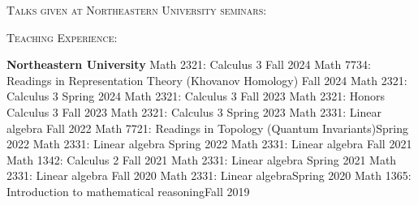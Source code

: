 \documentclass[12pt]{amsart}
\renewcommand{\i}{\indent}
\renewcommand{\j}{\indent}
\newcommand{\w}{\vskip5pt}
\newcommand{\newitem}[1]{\noindent\textsc{#1:}\vskip5pt  }
\renewcommand{\sl}{\mathfrak{sl}}
\begin{document}

\newitem{Talks given at Northeastern University seminars}

%
%
%
%
%
%

\newitem{Teaching Experience}

\textbf{Northeastern University}\w
\j Math 2321: Calculus 3 \hfill Fall 2024\w
\j Math 7734: Readings in Representation Theory (Khovanov Homology) \hfill Fall 2024\w
\j Math 2321: Calculus 3 \hfill Spring 2024\w
\j Math 2321: Calculus 3 \hfill Fall 2023\w
\j Math 2321: Honors Calculus 3 \hfill Fall 2023\w
\j Math 2321: Calculus 3 \hfill Spring 2023\w
\j Math 2331: Linear algebra \hfill Fall 2022\w
\j Math 7721: Readings in Topology (Quantum Invariants)\hfill Spring 2022\w
\j Math 2331: Linear algebra \hfill Spring 2022\w
\j Math 2331: Linear algebra \hfill Fall 2021\w
\j Math 1342: Calculus 2 \hfill Fall 2021\w
\j Math 2331: Linear algebra \hfill Spring 2021\w
\j Math 2331: Linear algebra \hfill Fall 2020\w
\j Math 2331: Linear algebra\hfill Spring 2020\w
\j Math 1365: Introduction to mathematical reasoning\hfill Fall 2019\w
\end{document}
